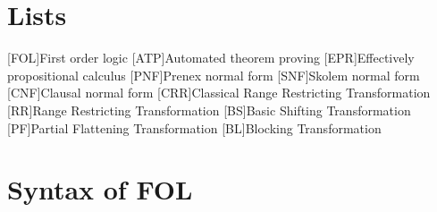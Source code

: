 \appendix
\renewcommand{\appendixtocname}{Appendix}
\renewcommand{\appendixpagename}{\appendixtocname}
\addappheadtotoc
{}
\appendixpage

\chapter{Lists}
\begin{acronym}[\hspace{3cm}]
  [FOL]{First order logic}
  [ATP]{Automated theorem proving}
  [EPR]{Effectively propositional calculus}
  [PNF]{Prenex normal form}
  [SNF]{Skolem normal form}
  [CNF]{Clausal normal form}
  [CRR]{Classical Range Restricting Transformation}
  [RR]{Range Restricting Transformation}
  [BS]{Basic Shifting Transformation}
  [PF]{Partial Flattening Transformation}
  [BL]{Blocking Transformation}
\end{acronym}
\clearpage

\listoffigures
{}

\listoftables
{}

\lstlistoflistings
{}

\listofalgorithms
{}


\chapter{Syntax of FOL}\label{chap:appendix_fol}
